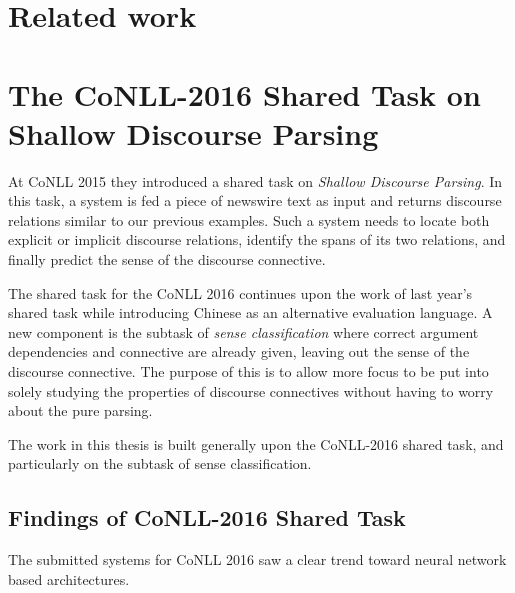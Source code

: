 \section{Related work}


\section{The CoNLL-2016 Shared Task on Shallow Discourse Parsing}

At CoNLL 2015 they introduced a shared task on \emph{Shallow Discourse Parsing}. In this task, a system is fed a piece of newswire text as input and returns discourse relations similar to our previous examples. Such a system needs to locate both explicit or implicit discourse relations, identify the spans of its two relations, and finally predict the sense of the discourse connective.


The shared task for the CoNLL 2016 continues upon the work of last year's shared task while introducing Chinese as an alternative evaluation language. A new component is the subtask of \emph{sense classification} where correct argument dependencies and connective are already given, leaving out the sense of the discourse connective. The purpose of this is to allow more focus to be put into solely studying the properties of discourse connectives without having to worry about the pure parsing.

The work in this thesis is built generally upon the CoNLL-2016 shared task, and particularly on the subtask of sense classification.

\subsection{Findings of CoNLL-2016 Shared Task}

The submitted systems for CoNLL 2016 saw a clear trend toward neural network based architectures.
